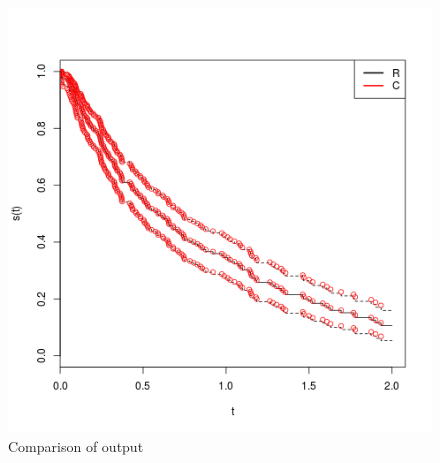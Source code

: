 \documentclass{article}
\begin{document}
\begin{center}
\begin{figure}[h]
	\caption{Comparison of output}
	\includegraphics{comparison}
\end{figure}
\end{center}
\end{document}
